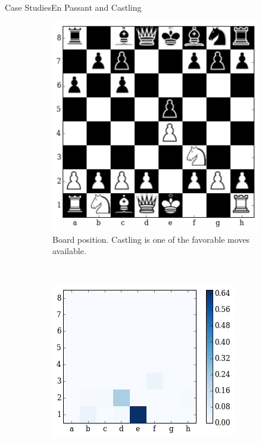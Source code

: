 \documentclass[9pt, unknownkeysallowed]{beamer}
\begin{document}
\begin{frame}{Case Studies}{En Passant and Castling}
\begin{figure}[H]
  \centering
    \begin{subfigure}[t]{0.3\textwidth}
        \centering
        \includegraphics[width=\textwidth]{../img/best_moves/output_22_0.png}
        \caption{Board position. Castling is one of the favorable moves 
available.}
    \end{subfigure}
    ~
    \begin{subfigure}[t]{0.3\textwidth}
        \centering
        \includegraphics[width=\textwidth]{../img/best_moves/output_22_2.png}

\end{subfigure}
\end{figure}
\end{frame}
\end{document}
